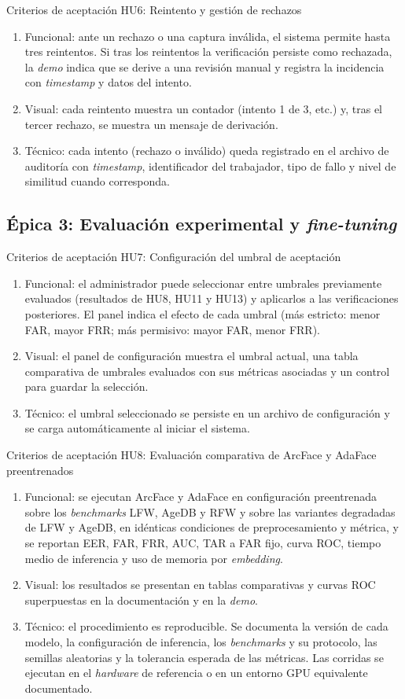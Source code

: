 \documentclass[
  11pt, %
]{charter}
\begin{document}
Criterios de aceptación HU6: Reintento y gestión de rechazos
\begin{enumerate}
  \item Funcional: ante un rechazo o una captura inválida, el sistema permite hasta tres reintentos. Si tras los reintentos la verificación persiste como rechazada, la \textit{demo} indica que se derive a una revisión manual y registra la incidencia con \textit{timestamp} y datos del intento.
  \item Visual: cada reintento muestra un contador (intento 1 de 3, etc.) y, tras el tercer rechazo, se muestra un mensaje de derivación.
  \item Técnico: cada intento (rechazo o inválido) queda registrado en el archivo de auditoría con \textit{timestamp}, identificador del trabajador, tipo de fallo y nivel de similitud cuando corresponda.
\end{enumerate}

\subsection{Épica 3: Evaluación experimental y \textit{fine-tuning}}

Criterios de aceptación HU7: Configuración del umbral de aceptación
\begin{enumerate}
  \item Funcional: el administrador puede seleccionar entre umbrales previamente evaluados (resultados de HU8, HU11 y HU13) y aplicarlos a las verificaciones posteriores. El panel indica el efecto de cada umbral (más estricto: menor FAR, mayor FRR; más permisivo: mayor FAR, menor FRR).
  \item Visual: el panel de configuración muestra el umbral actual, una tabla comparativa de umbrales evaluados con sus métricas asociadas y un control para guardar la selección.
  \item Técnico: el umbral seleccionado se persiste en un archivo de configuración y se carga automáticamente al iniciar el sistema.
\end{enumerate}

Criterios de aceptación HU8: Evaluación comparativa de ArcFace y AdaFace preentrenados
\begin{enumerate}
  \item Funcional: se ejecutan ArcFace y AdaFace en configuración preentrenada sobre los \textit{benchmarks} LFW, AgeDB y RFW y sobre las variantes degradadas de LFW y AgeDB, en idénticas condiciones de preprocesamiento y métrica, y se reportan EER, FAR, FRR, AUC, TAR a FAR fijo, curva ROC, tiempo medio de inferencia y uso de memoria por \textit{embedding}.
  \item Visual: los resultados se presentan en tablas comparativas y curvas ROC superpuestas en la documentación y en la \textit{demo}.
  \item Técnico: el procedimiento es reproducible. Se documenta la versión de cada modelo, la configuración de inferencia, los \textit{benchmarks} y su protocolo, las semillas aleatorias y la tolerancia esperada de las métricas. Las corridas se ejecutan en el \textit{hardware} de referencia o en un entorno GPU equivalente documentado.
\end{enumerate}
\end{document}
